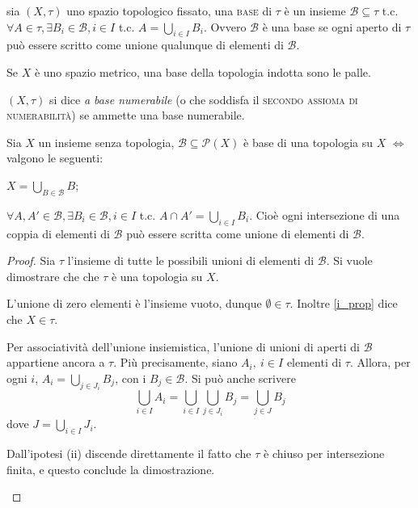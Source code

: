 \documentclass{article}
\begin{document}
\begin{defn}
	sia $(X, \tau)$ uno spazio topologico fissato, una \textsc{base} di $\tau$ è
	un insieme $\mathcal{B} \subseteq \tau$ t.c. $\forall A \in \tau, \exists
	B_i \in \mathcal{B}, i \in I$ t.c. $A= \bigcup_{i \in I} B_i$. Ovvero
	$\mathcal{B}$ \`e una base se ogni aperto di $\tau$ pu\`o essere scritto
	come unione qualunque di elementi di $\mathcal{B}$.
\end{defn}

\begin{ex}
	Se $X$ è uno spazio metrico, una base della topologia indotta sono le palle.
\end{ex}

\begin{defn}
	$(X, \tau)$ si dice \textit{a base numerabile} (o che soddisfa il
	\textsc{secondo assioma di numerabilità}) se ammette una base numerabile.
\end{defn}

\begin{prop}
	Sia $X$ un insieme senza topologia, $\mathcal{B} \subseteq \mathcal{P}(X)$ è
	base di una topologia su $X$ $\Leftrightarrow$ valgono le seguenti:
	\begin{nlist}
		\item \label{i_prop} $\displaystyle X=\bigcup_{B \in \mathcal{B}} B$;
		\item $\forall A, A' \in \mathcal{B}, \exists B_i \in \mathcal{B}, i \in
		I$ t.c. $A \cap A'= \bigcup_{i \in I} B_i$. Cio\`e ogni intersezione di
		una coppia di elementi di $\mathcal{B}$ pu\`o essere scritta come unione
		di elementi di $\mathcal{B}$.
	\end{nlist}
\end{prop}

\begin{proof} \label{base_car}
Sia $\tau$ l'insieme di tutte le possibili unioni di elementi di $\mathcal{B}$.
Si vuole dimostrare che che $\tau$ \`e una topologia su $X$.
\begin{nlist}
\item L'unione di zero elementi \`e l'insieme vuoto, dunque $\emptyset  \in
\tau$. Inoltre \ref{i_prop} dice che $X \in \tau$.
\item Per associativit\`a dell'unione insiemistica, l'unione di unioni di aperti
di $\mathcal{B}$ appartiene ancora a $\tau$. Pi\`u precisamente, siano $A_i,\ i
\in I$ elementi di $\tau$. Allora, per ogni $i$, $A_i = \bigcup_{j \in J_i}
B_j$, con i $B_j \in \mathcal{B}$. Si pu\`o anche scrivere
$$
\bigcup_{i \in I}A_i = \bigcup_{i \in I}\bigcup_{j \in J_i}B_j =
\bigcup_{j \in J}B_j
$$
dove $J = \bigcup_{i \in I}J_i$.
\item Dall'ipotesi (ii) discende direttamente il fatto che $\tau$ \`e chiuso per
intersezione finita, e questo conclude la dimostrazione.
\end{nlist}
\end{proof}
\end{document}
